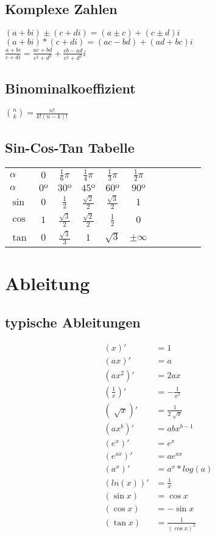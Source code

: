 \documentclass[a4paper, 8pt, landscape]{extarticle}
\begin{document}
\begin{multicols*}{5}
        \subsection{Komplexe Zahlen}
	        $(a + bi) \pm (c + di) = (a \pm c) + (c \pm d)i$\\
	        $(a + bi) * (c + di) = (ac - bd) + (ad + bc)i$\\

            $\displaystyle \frac{a + bi}{c + di} = \frac{ac + bd}{c^2 + d^2} + \frac{cb - ad}{c^2 + d^2}i$
        \subsection{Binominalkoeffizient}
        	$\binom{n}{k}=\frac{n!}{k!(n-k)!}$\\
       	\subsection{Sin-Cos-Tan Tabelle}
        	\begin{tabular}{l c  c  c  c  c  c  c  c  c  c }
        		$\alpha$ & $0$ & $\frac{1}{6}\pi$ & $\frac{1}{4}\pi$ & $\frac{1}{3}\pi$ & $\frac{1}{2}\pi$\\
        		\rowcolor{gray!10}
        		$\alpha$ & $0º$ & $30º$ & $45º$ & $60º$ & $90º$\\
        		$\sin$ & $0$ & $\frac{1}{2}$ & $\frac{\sqrt{2}}{2}$ & $\frac{\sqrt{3}}{2}$ & $1$\\
        		\rowcolor{gray!10}
        		$\cos$ & $1$ & $\frac{\sqrt{3}}{2}$ & $\frac{\sqrt{2}}{2}$ & $\frac{1}{2}$ & $0$\\
        		$\tan$ & $0$ & $\frac{\sqrt{3}}{3}$ & $1$ & $\sqrt{3}$ &$\pm\infty$
        	\end{tabular}
    \section{Ableitung}
        \subsection{typische Ableitungen}
           	\begin{align*}
           	(x)' &= 1 \\
           	(ax)' &= a \\
           	(ax^2)' &= 2ax \\
           	(\frac{1}{x})' &= -\frac{1}{x^2} \\
           	(\sqrt[]{x})' &= \frac{1}{2\sqrt[]{x}} \\
           	(ax^b)' &= abx^{b-1} \\
           	(e^x)' &= e^x  \\
           	(e^{ax})' &= ae^{ax}  \\
           	(a^x)' &= a^x*log(a)  \\
           	(ln(x))' &= \frac{1}{x} \\
           	(\sin x) &= \cos x \\
           	(\cos x) &= -\sin x \\
           	(\tan x) &= \frac{1}{(\cos x)^2}
           	\end{align*}

\end{multicols*}
\end{document}

